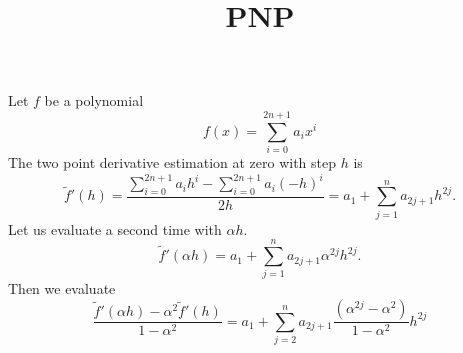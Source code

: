 \documentclass{revtex4}
\begin{document}
	\title{PNP}
	\maketitle

Let $f$ be a polynomial
$$
	f(x) = \sum_{i=0}^{2n+1} a_i x^i
$$
The two point derivative estimation at zero with step $h$ is
$$
	\tilde{f}'(h) = \dfrac{\displaystyle \sum_{i=0}^{2n+1} a_i h^i - \sum_{i=0}^{2n+1} a_i (-h)^i}{2h}
	 = a_1 + \sum_{j=1}^{n} a_{2j+1} h^{2j}.
$$
Let us evaluate a second time with $\alpha h$.
$$
	\tilde{f}'(\alpha h) = a_1 + \sum_{j=1}^{n} a_{2j+1} \alpha^{2j} h^{2j}.
$$
Then we evaluate
$$
	\dfrac{\tilde{f}'(\alpha h) - \alpha^2\tilde{f}'(h)}{1-\alpha^2} = 
	a_1 + \sum_{j=2}^{n} a_{2j+1} \dfrac{\left(\alpha^{2j} - \alpha^2\right)}{1-\alpha^2} h^{2j}
$$
\end{document}

